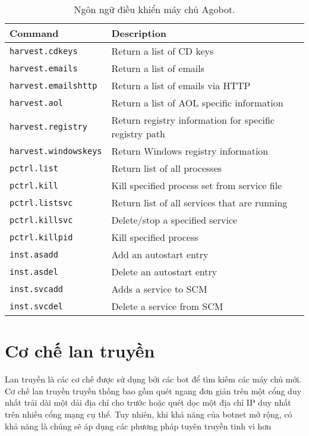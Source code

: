 \begin{table}[ht!]
	\caption{Ngôn ngữ điều khiển máy chủ Agobot.}\label{table:botctrl}
	\centering
	\footnotesize
	\begin{tabular}{l l}
		\toprule
		\textbf{Command} &
		\textbf{Description} \\
		\midrule
		\texttt{harvest.cdkeys} & Return a list of CD keys \\
		\texttt{harvest.emails} & Return a list of emails \\
		\texttt{harvest.emailshttp} & Return a list of emails via HTTP \\
		\texttt{harvest.aol} & Return a list of AOL specific information \\
		\texttt{harvest.registry} & Return registry information for specific registry path \\
		\texttt{harvest.windowskeys} & Return Windows registry information \\
		\texttt{pctrl.list} & Return list of all processes \\
		\texttt{pctrl.kill} & Kill specified process set from service file \\
		\texttt{pctrl.listsvc} & Return list of all services that are running \\
		\texttt{pctrl.killsvc} & Delete/stop a specified service \\
		\texttt{pctrl.killpid} & Kill specified process \\
		\texttt{inst.asadd} & Add an autostart entry \\
		\texttt{inst.asdel} & Delete an autostart entry \\
		\texttt{inst.svcadd} & Adds a service to SCM \\
		\texttt{inst.svcdel} & Delete a service from SCM \\
		\bottomrule
	\end{tabular}
\end{table}

\section{Cơ chế lan truyền}
Lan truyền là các cơ chế được sử dụng bởi các bot để tìm kiếm các máy chủ mới.
Cơ chế lan truyền truyền thống bao gồm quét ngang đơn giản trên một cổng duy nhất
trải dài một dải địa chỉ cho trước hoặc quét dọc một địa chỉ IP duy nhất trên nhiều cổng mạng cụ thể.
Tuy nhiên, khi khả năng của botnet mở rộng, có khả năng là chúng sẽ áp dụng các phương pháp tuyên truyền tinh vi hơn

